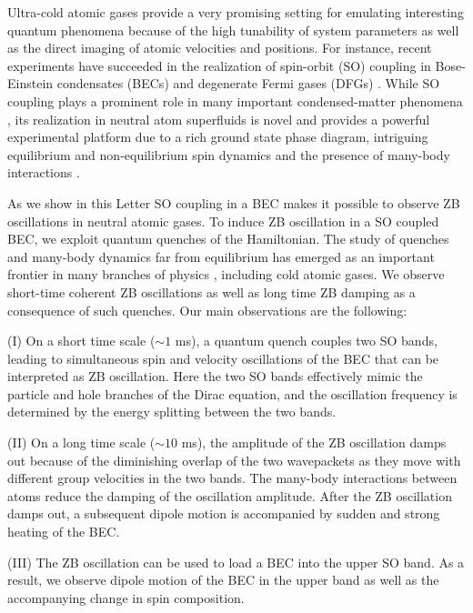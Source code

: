\documentclass[prl,aps,twocolumn,showpacs,floatfix]{revtex4-1}
\begin{document}
Ultra-cold atomic gases provide a very promising setting for emulating
interesting quantum phenomena because of the high tunability of system
parameters as well as the direct imaging of atomic velocities and positions.
For instance, recent experiments have succeeded in the realization of
spin-orbit (SO) coupling in Bose-Einstein condensates (BECs) and degenerate
Fermi gases (DFGs) \cite{Lin1,Pan - Collective Dipole modes,Zwierlein - Spin
Injection,Jing Zhang DFG SO,Dalibard}. While SO coupling plays a prominent
role in many important condensed-matter phenomena \cite{SOCM1,SOCM2,SOCM3},
its realization in neutral atom superfluids is novel and provides a powerful
experimental platform due to a rich ground state phase diagram, intriguing
equilibrium and non-equilibrium spin dynamics and the presence of many-body
interactions \cite%
{gs1,gs2,gs3,gs4,gs5,gs6,gs7,gs8,gs9,gs10,gs11,gs12,gs13,gs14}.

As we show in this Letter SO coupling in a BEC makes it possible to observe
ZB oscillations in neutral atomic gases. To induce ZB oscillation in a SO
coupled BEC, we exploit quantum quenches of the Hamiltonian. The study of
quenches and many-body dynamics far from equilibrium has emerged as an
important frontier in many branches of physics \cite%
{quench2,quench3,quench,Ising,Ising2,Ising3,Fermion,BH,Iso}, including cold
atomic gases. We observe short-time coherent ZB oscillations as well as long
time ZB damping as a consequence of such quenches. Our main observations are
the following:

(I) On a short time scale ($\sim 1$ ms), a quantum quench couples two SO
bands, leading to simultaneous spin and velocity oscillations of the BEC
that can be interpreted as ZB oscillation. Here the two SO bands effectively
mimic the particle and hole branches of the Dirac equation, and the
oscillation frequency is determined by the energy splitting between the two
bands.

(II) On a long time scale ($\sim 10$ ms), the amplitude of the ZB
oscillation damps out because of the diminishing overlap of the two
wavepackets as they move with different group velocities in the two bands.
The many-body interactions between atoms reduce the damping of the
oscillation amplitude. After the ZB oscillation damps out, a subsequent
dipole motion is accompanied by sudden and strong heating of the BEC.

(III) The ZB oscillation can be used to load a BEC into the upper SO band.
As a result, we observe dipole motion of the BEC in the upper band as well
as the accompanying change in spin composition.
\end{document}
